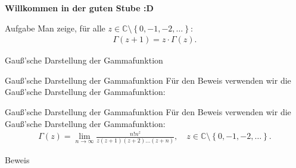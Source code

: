 \documentclass[10pt]{beamer}
\title{}
\author{Artur's \( \oint \) Mathematikstübchen}
\date{}
\def\bC{\mathbb{C}}
\begin{document}

\begin{frame}
    \begin{center}
        \textbf{\huge Willkommen in der guten Stube \newline \newline :D}
    \end{center}
\end{frame}




\begin{frame}
    \begin{alertblock}{Aufgabe}
        Man zeige, für alle \( z \in \bC \setminus \left\{ 0, -1, -2, \ldots \right\} \):
        \begin{align*}
            \Gamma\left( z + 1 \right) 
            = z \cdot \Gamma\left( z \right).
        \end{align*}
    \end{alertblock}
\end{frame}



\begin{frame}{Gauß'sche Darstellung der Gammafunktion}
    
\end{frame}



\begin{frame}{Gauß'sche Darstellung der Gammafunktion}
    Für den Beweis verwenden wir die Gauß'sche Darstellung der Gammafunktion:
\end{frame}



\begin{frame}{Gauß'sche Darstellung der Gammafunktion}
    Für den Beweis verwenden wir die Gauß'sche Darstellung der Gammafunktion: 
    \begin{align*}
        \Gamma\left( z \right)
        = \lim_{n \to \infty} \frac{n! n^{z}}{z \left( z + 1 \right) \left( z + 2 \right) \ldots \left( z + n \right)}, \quad z \in \bC \setminus \left\{ 0, -1, -2, \ldots \right\}.
    \end{align*}
\end{frame}



\begin{frame}{Beweis}
 
\end{frame}
\end{document}
